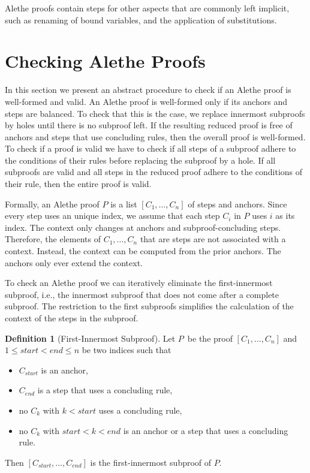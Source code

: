 \documentclass{scrartcl}
\theoremstyle{definition}
\newtheorem{definition}{Definition}[example]
\begin{document}
\noindent
Alethe proofs contain steps for other aspects that are commonly left implicit, such
as renaming of bound variables, and the application of substitutions.

\section{Checking Alethe Proofs}
\label{sec:alethe:semantics}

In this section we present an abstract procedure to check if an Alethe
proof is well-formed and valid.  An Alethe proof is
well-formed only if its anchors and steps are balanced.  To check that
this is the case, we replace innermost subproofs by holes until there is
no subproof left.  If the resulting reduced proof is free of anchors and steps
that use concluding rules, then the overall proof is well-formed.
To check if a proof is valid we have to check if all steps of a subproof
adhere to the conditions of
their rules before replacing the subproof by a hole.
If all subproofs are valid and all steps in the reduced
proof adhere to the conditions of their rule,
then the entire proof is valid.

Formally, an Alethe proof $P$ is a list $[C_1, \dots, C_n]$ of steps
and anchors.
Since every step uses an unique index, we assume that each step
$C_i$ in $P$ uses $i$ as its index.
The context
only changes at anchors and subproof-concluding steps.
Therefore, the elements of $C_1, \dots, C_n$ that are steps
are not associated with a context.
Instead, the context can be computed
from the prior anchors.
The anchors only ever extend the context.

To check an Alethe proof we can iteratively eliminate the first-innermost
subproof, i.e., the innermost subproof that does not come after a
complete subproof.  The restriction to the first subproofs simplifies
the calculation of the context of the steps in the subproof.

\begin{definition}[First-Innermost Subproof]
  Let $P$\, be the proof $[C_1, \dots, C_n]$ and $1 \leq \mathit{start}
  < \mathit{end} \leq n$ be two indices such that
  \begin{itemize}
    \item $C_{\mathit{start}}$ is an anchor,
    \item $C_{\mathit{end}}$ is a step that uses a concluding rule,
    \item no $C_k$ with $k < \mathit{start}$ uses a concluding rule,
    \item no $C_k$ with $\mathit{start} < k < \mathit{end}$ is an anchor or
     a step that uses a concluding rule.
  \end{itemize}
  Then $[C_{\mathit{start}}, \dots, C_{\mathit{end}}]$ is the
  first-innermost subproof of $P$.
\end{definition}
\end{document}
